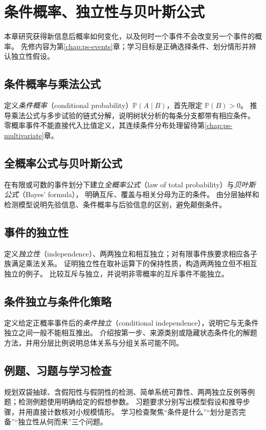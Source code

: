 \setcounter{chapter}{1} %
\chapter{条件概率、独立性与贝叶斯公式}
\label{chap:ps-conditioning}

本章研究获得新信息后概率如何变化，以及何时一个事件不会改变另一个事件的概率。
先修内容为第\ref{chap:ps-events}章；学习目标是正确选择条件、划分情形并辨认独立性假设。

\section{条件概率与乘法公式}
\label{sec:ps-conditional-probability}
定义\emph{条件概率}（conditional probability）$\mathbb P(A\mid B)$，首先限定 $\mathbb P(B)>0$。
推导乘法公式与多步试验的链式分解，说明树状分析的每条分支都带有相应条件。
零概率事件不能直接代入比值定义，其连续条件分布处理留待第\ref{chap:ps-multivariate}章。

\section{全概率公式与贝叶斯公式}
\label{sec:ps-total-bayes}
在有限或可数的事件划分下建立\emph{全概率公式}（law of total probability）与\emph{贝叶斯公式}（Bayes' formula），
明确互斥、覆盖与相关分母为正的条件。
由分层抽样和检测模型说明先验信息、条件概率与后验信息的区别，避免颠倒条件。

\section{事件的独立性}
\label{sec:ps-event-independence}
定义\emph{独立性}（independence）、两两独立和相互独立；对有限事件族要求相应各子族满足乘法关系。
证明独立性在取补运算下的保持性质，构造两两独立但不相互独立的例子。
比较互斥与独立，并说明非零概率的互斥事件不能独立。

\section{条件独立与条件化策略}
\label{sec:ps-conditional-independence}
定义给定正概率事件后的\emph{条件独立}（conditional independence），说明它与无条件独立之间一般不能相互推出。
介绍按第一步、来源类别或隐藏状态条件化的解题方法，并用分层比例说明总体关系与分组关系可能不同。

\section{例题、习题与学习检查}
规划双袋抽球、含假阳性与假阴性的检测、简单系统可靠性、两两独立反例等例题；检测例题使用明确给定的假想参数。
习题要求分别写出模型假设和推导步骤，并用直接计数核对小规模情形。
学习检查聚焦“条件是什么”“划分是否完备”“独立性从何而来”三个问题。






